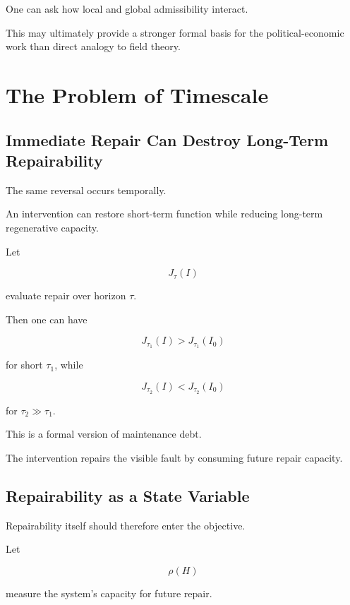 \documentclass[11pt]{article}
\theoremstyle{remark}
\begin{document}
One can ask how local and global admissibility interact.

This may ultimately provide a stronger formal basis for the political-economic work than direct analogy to field theory.

\section{The Problem of Timescale}

\subsection{Immediate Repair Can Destroy Long-Term Repairability}

The same reversal occurs temporally.

An intervention can restore short-term function while reducing long-term regenerative capacity.

Let

\begin{equation}
J_\tau(I)
\end{equation}

evaluate repair over horizon $\tau$.

Then one can have

\begin{equation}
J_{\tau_1}(I)>J_{\tau_1}(I_0)
\end{equation}

for short $\tau_1$, while

\begin{equation}
J_{\tau_2}(I)<J_{\tau_2}(I_0)
\end{equation}

for $\tau_2\gg\tau_1$.

This is a formal version of maintenance debt.

The intervention repairs the visible fault by consuming future repair capacity.

\subsection{Repairability as a State Variable}

Repairability itself should therefore enter the objective.

Let

\begin{equation}
\rho(H)
\end{equation}

measure the system's capacity for future repair.
\end{document}
